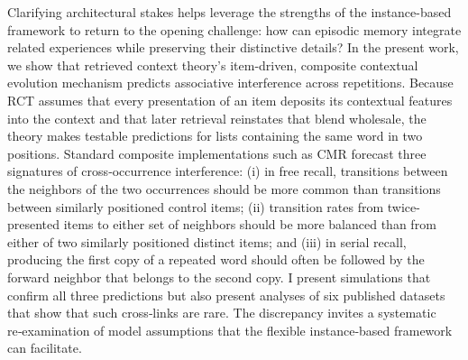 \documentclass[
  letterpaper,
  11pt,
  english,
  singlespacing,
  headsepline]{MastersDoctoralThesis}
\begin{document}
Clarifying architectural stakes helps leverage the strengths of the
instance-based framework to return to the opening challenge: how can
episodic memory integrate related experiences while preserving their
distinctive details? In the present work, we show that retrieved context
theory's item-driven, composite contextual evolution mechanism predicts
associative interference across repetitions. Because RCT assumes that
every presentation of an item deposits its contextual features into the
context and that later retrieval reinstates that blend wholesale, the
theory makes testable predictions for lists containing the same word in
two positions. Standard composite implementations such as CMR forecast
three signatures of cross‑occurrence interference: (i) in free recall,
transitions between the neighbors of the two occurrences should be more
common than transitions between similarly positioned control items; (ii)
transition rates from twice-presented items to either set of neighbors
should be more balanced than from either of two similarly positioned
distinct items; and (iii) in serial recall, producing the first copy of
a repeated word should often be followed by the forward neighbor that
belongs to the second copy. I present simulations that confirm all three
predictions but also present analyses of six published datasets that
show that such cross‑links are rare. The discrepancy invites a
systematic re‑examination of model assumptions that the flexible
instance‑based framework can facilitate.
\end{document}
